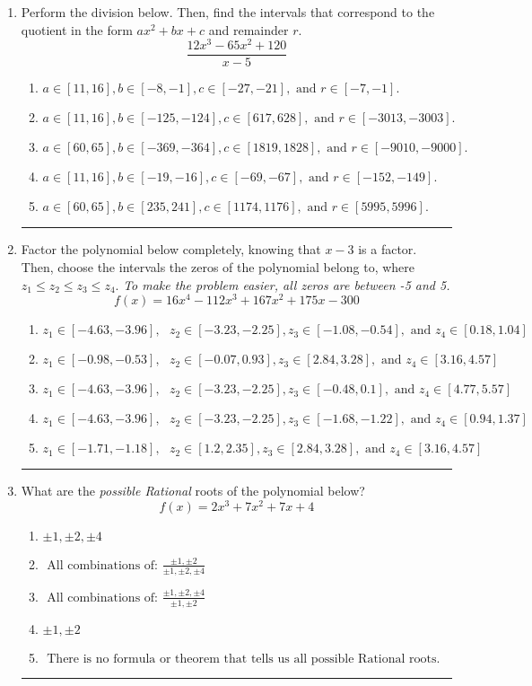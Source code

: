 \documentclass[14pt]{extbook}
\newcommand{\litem}[1]{\item#1\hspace*{-1cm}\rule{\textwidth}{0.4pt}}
\begin{document}
\begin{enumerate}
{\begin{enumerate}[label=\Alph*.]
\end{enumerate} }
\litem{
Perform the division below. Then, find the intervals that correspond to the quotient in the form $ax^2+bx+c$ and remainder $r$.\[ \frac{12x^{3} -65 x^{2} + 120}{x -5} \]\begin{enumerate}[label=\Alph*.]
\item \( a \in [11, 16], b \in [-8, -1], c \in [-27, -21], \text{ and } r \in [-7, -1]. \)
\item \( a \in [11, 16], b \in [-125, -124], c \in [617, 628], \text{ and } r \in [-3013, -3003]. \)
\item \( a \in [60, 65], b \in [-369, -364], c \in [1819, 1828], \text{ and } r \in [-9010, -9000]. \)
\item \( a \in [11, 16], b \in [-19, -16], c \in [-69, -67], \text{ and } r \in [-152, -149]. \)
\item \( a \in [60, 65], b \in [235, 241], c \in [1174, 1176], \text{ and } r \in [5995, 5996]. \)

\end{enumerate} }
\litem{
Factor the polynomial below completely, knowing that $x -3$ is a factor. Then, choose the intervals the zeros of the polynomial belong to, where $z_1 \leq z_2 \leq z_3 \leq z_4$. \textit{To make the problem easier, all zeros are between -5 and 5.}\[ f(x) = 16x^{4} -112 x^{3} +167 x^{2} +175 x -300 \]\begin{enumerate}[label=\Alph*.]
\item \( z_1 \in [-4.63, -3.96], \text{   }  z_2 \in [-3.23, -2.25], z_3 \in [-1.08, -0.54], \text{   and   } z_4 \in [0.18, 1.04] \)
\item \( z_1 \in [-0.98, -0.53], \text{   }  z_2 \in [-0.07, 0.93], z_3 \in [2.84, 3.28], \text{   and   } z_4 \in [3.16, 4.57] \)
\item \( z_1 \in [-4.63, -3.96], \text{   }  z_2 \in [-3.23, -2.25], z_3 \in [-0.48, 0.1], \text{   and   } z_4 \in [4.77, 5.57] \)
\item \( z_1 \in [-4.63, -3.96], \text{   }  z_2 \in [-3.23, -2.25], z_3 \in [-1.68, -1.22], \text{   and   } z_4 \in [0.94, 1.37] \)
\item \( z_1 \in [-1.71, -1.18], \text{   }  z_2 \in [1.2, 2.35], z_3 \in [2.84, 3.28], \text{   and   } z_4 \in [3.16, 4.57] \)

\end{enumerate} }
\litem{
What are the \textit{possible Rational} roots of the polynomial below?\[ f(x) = 2x^{3} +7 x^{2} +7 x + 4 \]\begin{enumerate}[label=\Alph*.]
\item \( \pm 1,\pm 2,\pm 4 \)
\item \( \text{ All combinations of: }\frac{\pm 1,\pm 2}{\pm 1,\pm 2,\pm 4} \)
\item \( \text{ All combinations of: }\frac{\pm 1,\pm 2,\pm 4}{\pm 1,\pm 2} \)
\item \( \pm 1,\pm 2 \)
\item \( \text{ There is no formula or theorem that tells us all possible Rational roots.} \)

\end{enumerate} }
\end{enumerate}
\end{document}
